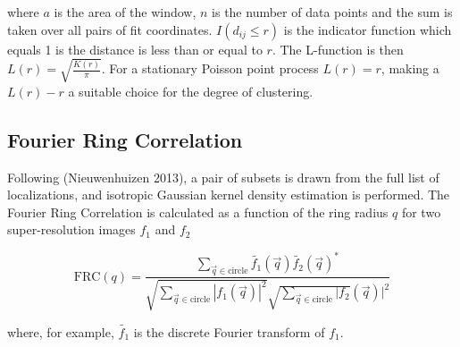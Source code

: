 \documentclass{ucetd}
\begin{document}
where $a$ is the area of the window, $n$ is the number of data points and the sum is taken over all pairs of fit coordinates. $I(d_{ij}\leq r)$ is the indicator function which equals 1 is the distance is less than or equal to $r$. The L-function is then $L(r) = \sqrt{\frac{K(r)}{\pi}}$. For a stationary Poisson point process $L(r) = r$, making a $L(r)-r$ a suitable choice for the degree of clustering.


\subsection{Fourier Ring Correlation}

Following (Nieuwenhuizen 2013), a pair of subsets is drawn from the full list of localizations, and isotropic Gaussian kernel density estimation is performed. The Fourier Ring Correlation is calculated as a function of the ring radius $q$ for two super-resolution images $f_{1}$ and $f_{2}$

\begin{equation*}
\mathrm{FRC}(q) = \frac{\sum_{\vec{q}\in\mathrm{circle}}\tilde{f_{1}}(\vec{q})\tilde{f_{2}}(\vec{q})^{*}}{\sqrt{\sum_{\vec{q}\in\mathrm{circle}}|f_{1}(\vec{q})|^{2}}\sqrt{\sum_{\vec{q}\in\mathrm{circle}}|f_{2}}(\vec{q})|^{2}}
\end{equation*}

where, for example, $\tilde{f_{1}}$ is the discrete Fourier transform of $f_{1}$.
\clearpage

\end{document}
